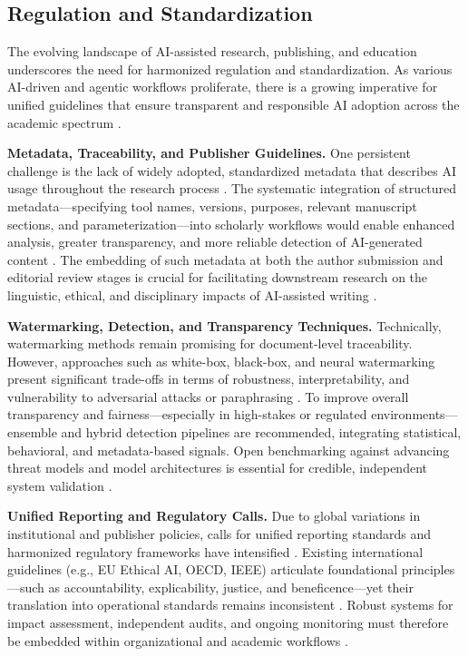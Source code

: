 \documentclass[sigconf]{acmart}
\begin{document}
\subsection{Regulation and Standardization}

The evolving landscape of AI-assisted research, publishing, and education underscores the need for harmonized regulation and standardization. As various AI-driven and agentic workflows proliferate, there is a growing imperative for unified guidelines that ensure transparent and responsible AI adoption across the academic spectrum \cite{ref1,ref2,ref5,ref9,ref10,ref28,ref29,ref30,ref31,ref37,ref38,ref43,ref51,ref61,ref62,ref63,ref68,ref78,ref80,ref86,ref87,ref88,ref89,ref90,ref96,ref98,ref106}.

\textbf{Metadata, Traceability, and Publisher Guidelines.}  
One persistent challenge is the lack of widely adopted, standardized metadata that describes AI usage throughout the research process \cite{ref95,ref100,ref101,ref106}. The systematic integration of structured metadata—specifying tool names, versions, purposes, relevant manuscript sections, and parameterization—into scholarly workflows would enable enhanced analysis, greater transparency, and more reliable detection of AI-generated content \cite{ref95,ref101,ref106}. The embedding of such metadata at both the author submission and editorial review stages is crucial for facilitating downstream research on the linguistic, ethical, and disciplinary impacts of AI-assisted writing \cite{ref95,ref100,ref101,ref106}.

\textbf{Watermarking, Detection, and Transparency Techniques.}  
Technically, watermarking methods remain promising for document-level traceability. However, approaches such as white-box, black-box, and neural watermarking present significant trade-offs in terms of robustness, interpretability, and vulnerability to adversarial attacks or paraphrasing \cite{ref53,ref86,ref91,ref97,ref98,ref100}. To improve overall transparency and fairness—especially in high-stakes or regulated environments—ensemble and hybrid detection pipelines are recommended, integrating statistical, behavioral, and metadata-based signals. Open benchmarking against advancing threat models and model architectures is essential for credible, independent system validation \cite{ref1,ref2,ref31,ref80,ref85,ref86,ref98,ref106}.

\textbf{Unified Reporting and Regulatory Calls.}  
Due to global variations in institutional and publisher policies, calls for unified reporting standards and harmonized regulatory frameworks have intensified \cite{ref5,ref9,ref10,ref28,ref29,ref30,ref31,ref38,ref43,ref63,ref68,ref87,ref88,ref89,ref90,ref106}. Existing international guidelines (e.g., EU Ethical AI, OECD, IEEE) articulate foundational principles—such as accountability, explicability, justice, and beneficence—yet their translation into operational standards remains inconsistent \cite{ref9,ref10,ref28,ref29,ref38,ref51,ref62,ref86,ref87,ref88,ref90,ref96,ref106}. Robust systems for impact assessment, independent audits, and ongoing monitoring must therefore be embedded within organizational and academic workflows \cite{ref29,ref31,ref43,ref61,ref62,ref63,ref80,ref84,ref85,ref89,ref92,ref95,ref96,ref98,ref100,ref106}.
\end{document}
